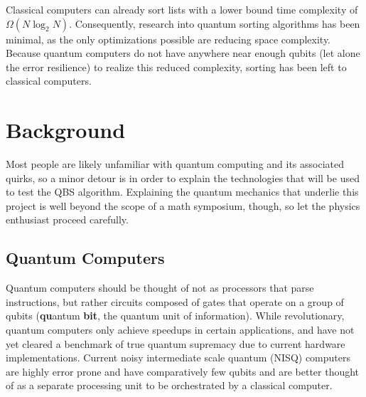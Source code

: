 \documentclass[12pt]{article}
\begin{document}
Classical computers can already sort lists with a lower bound time complexity of $\Omega (N \log_2 N)$. Consequently, research into quantum sorting algorithms has been minimal, as the only optimizations possible are reducing space complexity. Because quantum computers do not have anywhere near enough qubits (let alone the error resilience) to realize this reduced complexity, sorting has been left to classical computers.

\section{Background}
Most people are likely unfamiliar with quantum computing and its associated quirks, so a minor detour is in order to explain the technologies that will be used to test the QBS algorithm. Explaining the quantum mechanics that underlie this project is well beyond the scope of a math symposium, though, so let the physics enthusiast proceed carefully.

\subsection{Quantum Computers}
Quantum computers should be thought of not as processors that parse instructions, but rather circuits composed of gates that operate on a group of qubits (\textbf{qu}antum \textbf{bit}, the quantum unit of information). While revolutionary, quantum computers only achieve speedups in certain applications, and have not yet cleared a benchmark of true quantum supremacy due to current hardware implementations. Current noisy intermediate scale quantum (NISQ) computers are highly error prone and have comparatively few qubits and are better thought of as a separate processing unit to be orchestrated by a classical computer.
\end{document}
